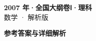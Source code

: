 \documentclass[zihao=-4, a4paper]{ctexart}
\begin{document}
\begin{center}
  {\Large\bfseries 2007 年·全国大纲卷Ⅰ·理科}\\[4pt]
  {\large 数学 · 解析版}
\end{center}
\medskip
{}

\clearpage
{}
\begin{center}{\Large\bfseries 参考答案与详细解析}\end{center}
\medskip

\end{document}

